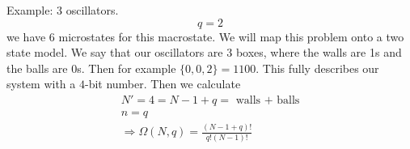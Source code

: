 \documentclass[]{scrartcl}
\begin{document}
Example: 3 oscillators.
\begin{equation}
	q = 2
\end{equation}
we have 6 microstates for this macrostate. We will map this problem onto a two state model. We say that our oscillators are 3 boxes, where the walls are 1s and the balls are 0s. Then for example $\{0,0,2\} = 1100$. This fully describes our system with a $4$-bit number. Then we calculate
\begin{gather}
	N'=4 = N - 1 + q = \text{ walls + balls}\\
	n = q\\
	\Rightarrow \Omega(N, q) = \frac{(N-1+q)!}{q!(N-1)!}
\end{gather}
\end{document}
